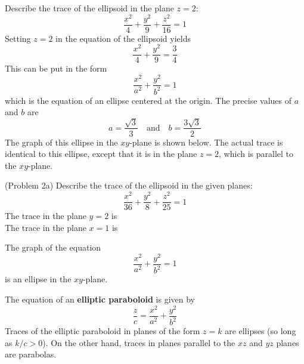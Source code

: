 \documentclass[handout]{ximera}
\begin{document}
\begin{example}[Example 2]
Describe the trace of the ellipsoid in the plane $z = 2$:
\[
\frac{x^2}{4} + \frac{y^2}{9}+ \frac{z^2}{16} = 1
\]
Setting $z = 2$ in the equation of the ellipsoid yields
\[
\frac{x^2}{4} + \frac{y^2}{9} = \frac34
\]
This can be put in the form
\[
\frac{x^2}{a^2} + \frac{y^2}{b^2} = 1
\]
which is the equation of an ellipse centered at the origin. The precise values of $a$ and $b$ are
\[
a = \frac{\sqrt 3}{3} \quad \text{and} \quad b = \frac{3\sqrt 3}{2}
\]
The graph of this ellipse in the $xy$-plane is shown below.
The actual trace is identical to this ellipse, except that it is in the plane $z = 2$, which is parallel to the $xy$-plane.

\begin{image}
\end{image}

\end{example}

\begin{problem}(Problem 2a)
Describe the trace of the ellipsoid in the given planes:
\[
\frac{x^2}{36} + \frac{y^2}{8}+ \frac{z^2}{25} = 1
\]
The trace in the plane $y = 2$ is \\
The trace in the plane $x = 1$ is 
\begin{hint}
The graph of the equation
\[
\frac{x^2}{a^2} + \frac{y^2}{b^2} = 1
\]
is an ellipse in the $xy$-plane.
\end{hint}
\end{problem}

The equation of an \textbf{elliptic paraboloid} is given by 
\[
\frac{z}{c} = \frac{x^2}{a^2} + \frac{y^2}{b^2} 
\]
Traces of the elliptic paraboloid in planes of the form $z = k$ are ellipses (so long as $k/c > 0$).
On the other hand, traces in planes parallel to the $xz$ and $yz$ planes are parabolas.
\end{document}
